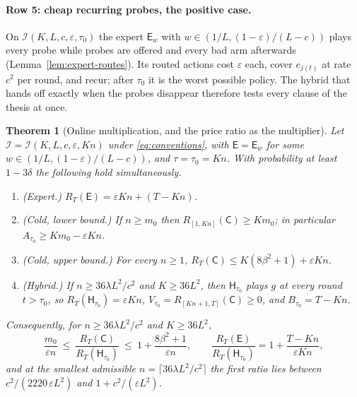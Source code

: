 \documentclass{article}
\newtheorem{theorem}{Theorem}
\theoremstyle{definition}
\theoremstyle{remark}
\newcommand{\eps}{\varepsilon}
\theoremstyle{remark}
\newcommand{\Cold}{\mathsf{C}}
\newcommand{\Exp}{\mathsf{E}}
\newcommand{\Hyb}{\mathsf{H}}
\begin{document}
\paragraph{Row 5: cheap recurring probes, the positive case.}
On $\mathcal I(K,L,c,\eps,\tau_0)$ the expert $\Exp_w$ with
$w\in(1/L,(1-\eps)/(L-c))$ plays every probe while probes are offered and
every bad arm afterwards (Lemma~\ref{lem:expert-routes}). Its routed actions
cost $\eps$ each, cover $e_{j(t)}$ at rate $c^2$ per round, and recur; after
$\tau_0$ it is the worst possible policy. The hybrid that hands off exactly
when the probes disappear therefore tests every clause of the thesis at once.

\begin{theorem}[Online multiplication, and the price ratio as the multiplier]
\label{thm:price}
Let $\mathcal I=\mathcal I(K,L,c,\eps,Kn)$ under \eqref{eq:conventions}, with
$\Exp=\Exp_w$ for some $w\in(1/L,(1-\eps)/(L-c))$, and $\tau=\tau_0=Kn$. With
probability at least $1-3\delta$ the following hold simultaneously.
\begin{enumerate}[itemsep=1pt,topsep=1pt,leftmargin=*]
\item[(i)] \emph{(Expert.)} $R_T(\Exp)=\eps Kn+(T-Kn)$.
\item[(ii)] \emph{(Cold, lower bound.)} If $n\ge m_0$ then
$R_{[1,Kn]}(\Cold)\ge Km_0$; in particular $A_{\tau_0}\ge Km_0-\eps Kn$.
\item[(iii)] \emph{(Cold, upper bound.)} For every $n\ge1$, $R_T(\Cold)\le K(8\beta^2+1)+\eps Kn$.
\item[(iv)] \emph{(Hybrid.)} If $n\ge36\lambda L^2/c^2$ and $K\ge36L^2$, then
$\Hyb_{\tau_0}$ plays $g$ at every round $t>\tau_0$, so
$R_T(\Hyb_{\tau_0})=\eps Kn$, $V_{\tau_0}=R_{[Kn+1,T]}(\Cold)\ge0$, and
$B_{\tau_0}=T-Kn$.
\end{enumerate}
Consequently, for $n\ge36\lambda L^2/c^2$ and $K\ge36L^2$,
\begin{equation}
\label{eq:price-ratio}
\frac{m_0}{\eps n}\ \le\ \frac{R_T(\Cold)}{R_T(\Hyb_{\tau_0})}\ \le\ 1+\frac{8\beta^2+1}{\eps n},
\qquad
\frac{R_T(\Exp)}{R_T(\Hyb_{\tau_0})}=1+\frac{T-Kn}{\eps Kn},
\end{equation}
and at the smallest admissible $n=\lceil36\lambda L^2/c^2\rceil$ the first
ratio lies between $c^2/(2220\,\eps L^2)$ and $1+c^2/(\eps L^2)$.
\end{theorem}
\end{document}
